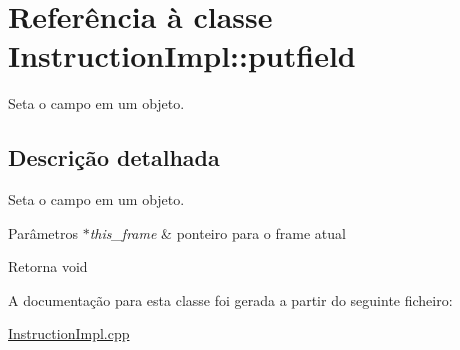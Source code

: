 \hypertarget{class_instruction_impl_1_1putfield}{}\section{Referência à classe Instruction\+Impl\+:\+:putfield}
\label{class_instruction_impl_1_1putfield}


Seta o campo em um objeto.  




\subsection{Descrição detalhada}
Seta o campo em um objeto. 


\begin{DoxyParams}{Parâmetros}
{\em $\ast$this\+\_\+frame} & ponteiro para o frame atual \\
\hline
\end{DoxyParams}
\begin{DoxyReturn}{Retorna}
void 
\end{DoxyReturn}


A documentação para esta classe foi gerada a partir do seguinte ficheiro\+:\begin{DoxyCompactItemize}
\item 
\hyperlink{_instruction_impl_8cpp}{Instruction\+Impl.\+cpp}\end{DoxyCompactItemize}
